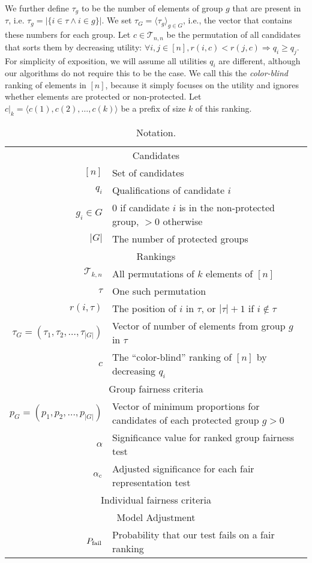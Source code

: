 We further define $\tau_g$ to be the number of elements of group $ g $ that are present in $\tau$, i.e. $\tau_g = | \{ i \in \tau \wedge i \in g \} |$.
%
We set $ \tau_G = \langle\tau_g\rangle_{g \in G}$, i.e., the vector that contains these numbers for each group.
%
Let $c \in {\mathcal T}_{n,n}$ be the permutation of all candidates that sorts them by decreasing utility: $\forall i,j \in [n], r(i,c) < r(j,c) \Rightarrow q_i \ge q_j$.
%
For simplicity of exposition, we will assume all utilities $q_i$ are different, although our algorithms do not require this to be the case.
%
We call this the \emph{color-blind} ranking of elements in $[n]$, because it simply focuses on the utility and ignores whether elements are protected or non-protected.
%
Let $c|_k = \langle c(1), c(2), \dots, c(k) \rangle$ be a prefix of size $k$ of this ranking. \label{concept:color-blind-ranking}
%

\begin{table}[t]
\caption{Notation.}
\label{tbl:notation}
\small\begin{tabular}{rl}\toprule
\multicolumn{2}{c}{Candidates} \\
$[n]$ & Set of candidates \\
$q_i$ & Qualifications of candidate $i$ \\
$g_i \in G$ & 0 if candidate $i$ is in the non-protected group, $ >0 $ otherwise\\
$|G|$ & The number of protected groups \\
\midrule
\multicolumn{2}{c}{Rankings} \\
${\mathcal T}_{k,n}$ & All permutations of $k$ elements of $[n]$ \\
$\tau$ & One such permutation \\
$r(i,\tau)$ & The position of $i$ in $\tau$, or $|\tau|+1$ if $i \notin \tau$ \\
$ \tau_G = \left(\tau_1, \tau_2, \ldots, \tau_{|G|}\right)$ & Vector of number of elements from group $ g $ in $\tau$ \\
$c$ & The ``color-blind'' ranking of $[n]$ by decreasing $q_i$ \\
\midrule
\multicolumn{2}{c}{Group fairness criteria} \\
$p_G=\left(p_1, p_2, \ldots, p_{|G|}\right)$ & Vector of minimum proportions for candidates of each protected group $ g > 0 $ \\
$\alpha$ & Significance value for ranked group fairness test \\
$\alpha_c$ & Adjusted significance for each fair representation test \\
\midrule
\multicolumn{2}{c}{Individual fairness criteria} \\
\midrule
\multicolumn{2}{c}{Model Adjustment} \\
$ P_{\operatorname{fail}} $ & Probability that our test fails on a fair ranking \\
\bottomrule
\end{tabular}
\end{table}

